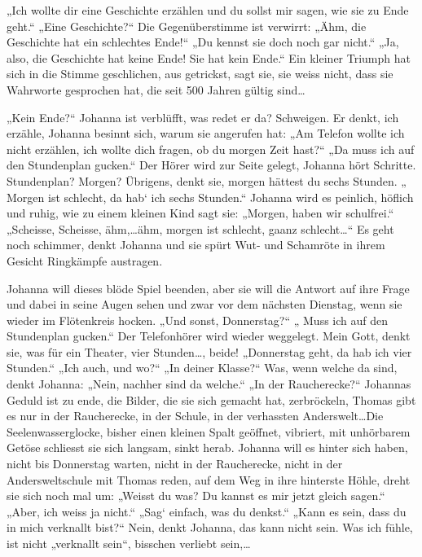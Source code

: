 \documentclass[10pt,titlepage,a5paper]{book}
\begin{document}
„Ich wollte dir eine Geschichte erzählen und du sollst mir sagen, wie sie zu Ende geht.“ „Eine Geschichte?“ Die Gegenüberstimme ist verwirrt: „Ähm, die Geschichte hat ein schlechtes Ende!“ „Du kennst sie doch noch gar nicht.“ „Ja, also, die Geschichte hat keine Ende! Sie hat kein Ende.“ Ein kleiner Triumph hat sich in die Stimme geschlichen, aus getrickst, sagt sie, sie weiss nicht, dass sie Wahrworte gesprochen hat, die seit 500 Jahren gültig sind\dots 

„Kein Ende?“ Johanna ist verblüfft, was redet er da? Schweigen.
Er denkt, ich erzähle, Johanna besinnt sich, warum sie angerufen hat: „Am Telefon wollte ich nicht erzählen, ich wollte dich fragen, ob du morgen Zeit hast?“ „Da muss ich auf den Stundenplan gucken.“ Der Hörer wird zur Seite gelegt, Johanna hört Schritte. Stundenplan? Morgen? Übrigens, denkt sie, morgen hättest du sechs Stunden. „ Morgen ist schlecht, da hab` ich sechs Stunden.“ Johanna wird es peinlich, höflich und ruhig, wie zu einem kleinen Kind sagt sie: „Morgen, haben wir schulfrei.“ „Scheisse, Scheisse, ähm,\dots ähm, morgen ist schlecht, gaanz schlecht\dots “ Es geht noch schimmer, denkt Johanna und sie spürt Wut- und Schamröte in ihrem Gesicht Ringkämpfe austragen.

Johanna will dieses blöde Spiel beenden, aber sie will die Antwort auf ihre Frage und dabei in seine Augen sehen und zwar vor dem nächsten Dienstag, wenn sie wieder im Flötenkreis hocken. „Und sonst, Donnerstag?“ „ Muss ich auf den Stundenplan gucken.“ Der Telefonhörer wird wieder weggelegt. Mein Gott, denkt sie, was für ein Theater, vier Stunden\dots , beide! „Donnerstag geht, da hab ich vier Stunden.“ „Ich auch, und wo?“ „In deiner Klasse?“ Was, wenn welche da sind, denkt Johanna: „Nein, nachher sind da welche.“ „In der Raucherecke?“ Johannas Geduld ist zu ende, die Bilder, die sie sich gemacht hat, zerbröckeln, Thomas gibt es nur in der Raucherecke, in der Schule, in der verhassten Anderswelt\dots  Die Seelenwasserglocke, bisher einen kleinen Spalt geöffnet, vibriert, mit unhörbarem Getöse schliesst sie sich langsam, sinkt herab. Johanna will es hinter sich haben, nicht bis Donnerstag warten, nicht in der Raucherecke, nicht in der Andersweltschule mit Thomas reden, auf dem Weg in ihre hinterste Höhle, dreht sie sich noch mal um: „Weisst du was? Du kannst es mir jetzt gleich sagen.“ „Aber, ich weiss ja nicht.“ „Sag` einfach, was du denkst.“ „Kann es sein, dass du in mich verknallt bist?“ Nein, denkt Johanna, das kann nicht sein. Was ich fühle, ist nicht „verknallt sein“, bisschen verliebt sein,\dots 
\end{document}

